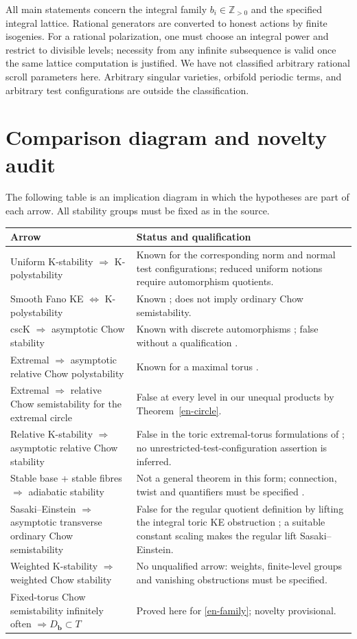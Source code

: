 \documentclass[12pt]{amsart}
\theoremstyle{definition}
\theoremstyle{remark}
\numberwithin{equation}{section}
\newcommand{\Z}{\mathbb{Z}}
\begin{document}
All main statements concern the integral family $b_i\in\Z_{>0}$ and the specified integral lattice. Rational generators are converted to honest actions by finite isogenies. For a rational polarization, one must choose an integral power and restrict to divisible levels; necessity from any infinite subsequence is valid once the same lattice computation is justified. We have not classified arbitrary rational scroll parameters here. Arbitrary singular varieties, orbifold periodic terms, and arbitrary test configurations are outside the classification.

\section{Comparison diagram and novelty audit}\label{en-audit}

The following table is an implication diagram in which the hypotheses are part of each arrow. All stability groups must be fixed as in the source.
\begingroup\small
\begin{longtable}{p{}p{}}
\hline
Arrow & Status and qualification\\ \hline
Uniform K-stability $\Rightarrow$ K-polystability &
Known for the corresponding norm and normal test configurations; reduced uniform notions require automorphism quotients.\\
Smooth Fano KE $\Leftrightarrow$ K-polystability &
Known \cite{en-CDS}; does not imply ordinary Chow semistability.\\
cscK $\Rightarrow$ asymptotic Chow stability &
Known with discrete automorphisms \cite{en-Don01}; false without a qualification \cite{en-OSY}.\\
Extremal $\Rightarrow$ asymptotic relative Chow polystability &
Known for a maximal torus \cite{en-Mab16,en-Sey,en-ST}.\\
Extremal $\Rightarrow$ relative Chow semistability for the extremal circle &
False at every level in our unequal products by Theorem~\ref{en-circle}.\\
Relative K-stability $\Rightarrow$ asymptotic relative Chow stability &
False in the toric extremal-torus formulations of \cite{en-YZ}; no unrestricted-test-configuration assertion is inferred.\\
Stable base + stable fibres $\Rightarrow$ adiabatic stability &
Not a general theorem in this form; connection, twist and quantifiers must be specified \cite{en-DS19,en-DS20,en-Hat}.\\
Sasaki--Einstein $\Rightarrow$ asymptotic transverse ordinary Chow semistability &
False for the regular quotient definition by lifting the integral toric KE obstruction \cite{en-OSY}; a suitable constant scaling makes the regular lift Sasaki--Einstein.\\
Weighted K-stability $\Rightarrow$ weighted Chow stability &
No unqualified arrow: weights, finite-level groups and vanishing obstructions must be specified.\\
Fixed-torus Chow semistability infinitely often $\Rightarrow D_{\boldsymbol b}\subset T$ &
Proved here for \eqref{en-family}; novelty provisional.\\ \hline
\end{longtable}
\endgroup
\end{document}
